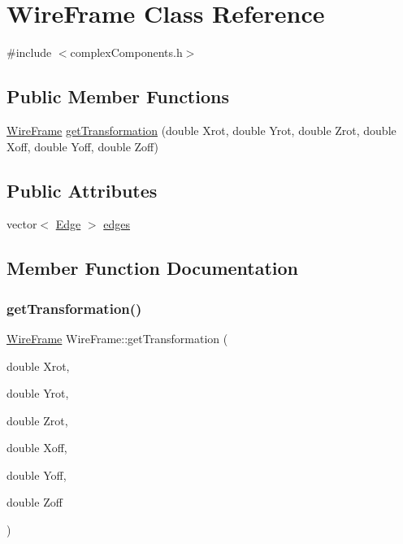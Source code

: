 \hypertarget{classWireFrame}{}\section{Wire\+Frame Class Reference}
\label{classWireFrame}


{\ttfamily \#include $<$complex\+Components.\+h$>$}

\subsection*{Public Member Functions}
\begin{DoxyCompactItemize}
\item 
\hyperlink{classWireFrame}{Wire\+Frame} \hyperlink{classWireFrame_a2cbc8d66f5c958499d5ffa3654988d5e}{get\+Transformation} (double Xrot, double Yrot, double Zrot, double Xoff, double Yoff, double Zoff)
\end{DoxyCompactItemize}
\subsection*{Public Attributes}
\begin{DoxyCompactItemize}
\item 
vector$<$ \hyperlink{structEdge}{Edge} $>$ \hyperlink{classWireFrame_a95f1653c5b972aa8514d34c0b7633d75}{edges}
\end{DoxyCompactItemize}


\subsection{Member Function Documentation}
\mbox{\label{classWireFrame_a2cbc8d66f5c958499d5ffa3654988d5e}} 
\subsubsection{\texorpdfstring{get\+Transformation()}{getTransformation()}}
{\footnotesize\ttfamily \hyperlink{classWireFrame}{Wire\+Frame} Wire\+Frame\+::get\+Transformation (\begin{DoxyParamCaption}\item[{double}]{Xrot,  }\item[{double}]{Yrot,  }\item[{double}]{Zrot,  }\item[{double}]{Xoff,  }\item[{double}]{Yoff,  }\item[{double}]{Zoff }\end{DoxyParamCaption})}

